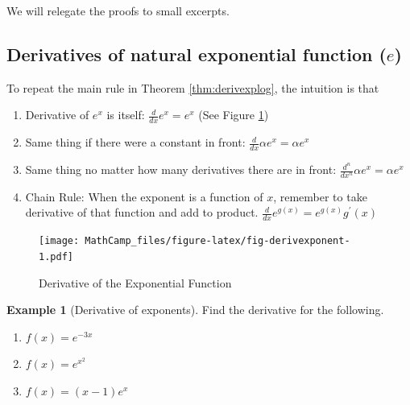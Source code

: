 \documentclass[
]{book}
\providecommand{\tightlist}{%
  \setlength{\itemsep}{0pt}\setlength{\parskip}{0pt}}
\theoremstyle{definition}
\theoremstyle{definition}
\newtheorem{example}{Example}[chapter]
\theoremstyle{definition}
\theoremstyle{definition}
\theoremstyle{remark}
\begin{document}
We will relegate the proofs to small excerpts.

\hypertarget{derivatives-of-natural-exponential-function-e}{%
\subsection*{\texorpdfstring{Derivatives of natural exponential function (\(e\))}{Derivatives of natural exponential function (e)}}\label{derivatives-of-natural-exponential-function-e}}

To repeat the main rule in Theorem \ref{thm:derivexplog}, the intuition is that

\begin{enumerate}
\def\labelenumi{\arabic{enumi}.}
\tightlist
\item
  Derivative of \(e^x\) is itself: \(\frac{d}{dx}e^x = e^x\) (See Figure \ref{fig:fig-derivexponent})
\item
  Same thing if there were a constant in front: \(\frac{d}{dx}\alpha e^x = \alpha e^x\)
\item
  Same thing no matter how many derivatives there are in front: \(\frac{d^n}{dx^n} \alpha e^x = \alpha e^x\)
\item
  Chain Rule: When the exponent is a function of \(x\), remember to take derivative of that function and add to product. \(\frac{d}{dx}e^{g(x)}= e^{g(x)} g^\prime(x)\)
\end{enumerate}

\begin{figure}
\centering
\texttt{[image: MathCamp\_files/figure-latex/fig-derivexponent-1.pdf]}
\caption{\label{fig:fig-derivexponent}Derivative of the Exponential Function}
\end{figure}

\begin{example}[Derivative of exponents]
\protect\hypertarget{exm:exmderivexp}{}{\label{exm:exmderivexp} {} }Find the derivative for the following.

\begin{enumerate}
\def\labelenumi{\arabic{enumi}.}
\tightlist
\item
  \(f(x)=e^{-3x}\)
\item
  \(f(x)=e^{x^2}\)
\item
  \(f(x)=(x-1)e^x\)
\end{enumerate}
\end{example}
\end{document}
